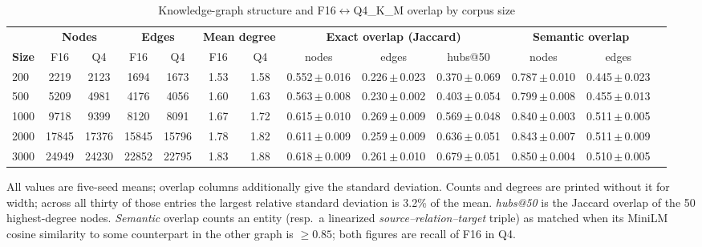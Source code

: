 \begin{table}[t]
\centering
\caption{Knowledge-graph structure and F16$\leftrightarrow$Q4\_K\_M overlap by corpus size}
\label{tab:kg}
\footnotesize
\setlength{\tabcolsep}{4pt}
\begin{tabular}{lcccccccccccc}
\toprule
& \multicolumn{2}{c}{\textbf{Nodes}} & \multicolumn{2}{c}{\textbf{Edges}} & \multicolumn{2}{c}{\textbf{Mean degree}} & \multicolumn{3}{c}{\textbf{Exact overlap (Jaccard)}} & \multicolumn{2}{c}{\textbf{Semantic overlap}} \\
\cmidrule(lr){2-3}\cmidrule(lr){4-5}\cmidrule(lr){6-7}\cmidrule(lr){8-10}\cmidrule(lr){11-12}
\textbf{Size} & F16 & Q4 & F16 & Q4 & F16 & Q4 & nodes & edges & hubs@50 & nodes & edges \\
\midrule
200 & 2219 & 2123 & 1694 & 1673 & 1.53 & 1.58 & 0.552\,$\pm$\,0.016 & 0.226\,$\pm$\,0.023 & 0.370\,$\pm$\,0.069 & 0.787\,$\pm$\,0.010 & 0.445\,$\pm$\,0.023 \\
\rowcolor{gray!10}500 & 5209 & 4981 & 4176 & 4056 & 1.60 & 1.63 & 0.563\,$\pm$\,0.008 & 0.230\,$\pm$\,0.002 & 0.403\,$\pm$\,0.054 & 0.799\,$\pm$\,0.008 & 0.455\,$\pm$\,0.013 \\
1000 & 9718 & 9399 & 8120 & 8091 & 1.67 & 1.72 & 0.615\,$\pm$\,0.010 & 0.269\,$\pm$\,0.009 & 0.569\,$\pm$\,0.048 & 0.840\,$\pm$\,0.003 & 0.511\,$\pm$\,0.005 \\
\rowcolor{gray!10}2000 & 17845 & 17376 & 15845 & 15796 & 1.78 & 1.82 & 0.611\,$\pm$\,0.009 & 0.259\,$\pm$\,0.009 & 0.636\,$\pm$\,0.051 & 0.843\,$\pm$\,0.007 & 0.511\,$\pm$\,0.009 \\
3000 & 24949 & 24230 & 22852 & 22795 & 1.83 & 1.88 & 0.618\,$\pm$\,0.009 & 0.261\,$\pm$\,0.010 & 0.679\,$\pm$\,0.051 & 0.850\,$\pm$\,0.004 & 0.510\,$\pm$\,0.005 \\
\bottomrule
\end{tabular}
\parbox[t]{0.95\textwidth}{\vspace{0.1cm}All values are five-seed means; overlap columns additionally give the standard deviation. Counts and degrees are printed without it for width; across all thirty of those entries the largest relative standard deviation is 3.2\% of the mean. \emph{hubs@50} is the Jaccard overlap of the 50 highest-degree nodes. \emph{Semantic} overlap counts an entity (resp.\ a linearized \emph{source--relation--target} triple) as matched when its MiniLM cosine similarity to some counterpart in the other graph is $\geq 0.85$; both figures are recall of F16 in Q4.}
\end{table}
